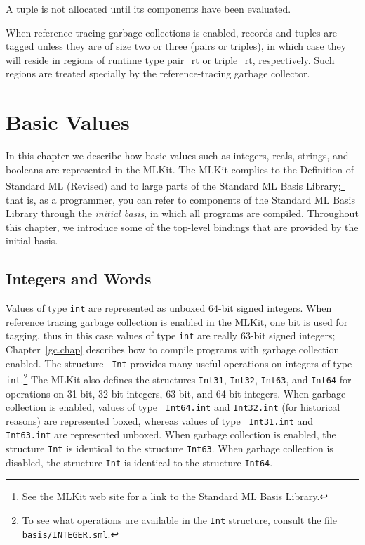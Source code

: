 \documentclass[12pt]{book}
\begin{document}
A tuple is not allocated until its components have been evaluated.

When reference-tracing garbage collections is enabled, records and
tuples are tagged unless they are of size two or three (pairs or
triples), in which case they will reside in regions of runtime type
{\sc pair\_rt} or {\sc triple\_rt}, respectively. Such regions are
treated specially by the reference-tracing garbage collector.

\chapter{Basic Values}
In this chapter we describe how basic values such as integers, reals,
strings, and booleans are represented in the MLKit. The MLKit complies to
the Definition of Standard ML (Revised)
%
and to large parts of the Standard ML Basis
Library;\footnote{See the MLKit web site for a link to the Standard ML
  Basis Library.}
%
%
that is, as a programmer, you can refer to components of the Standard
ML Basis Library through the
%
{\em initial basis}, in which all programs are compiled.  Throughout
this chapter, we introduce some of the top-level bindings that are
provided by the initial basis.

\section{Integers and Words}
\label{integers.sec}
Values of type
%
{\tt int} are represented as unboxed 64-bit signed integers. When
reference tracing garbage collection is enabled in the MLKit, one bit is
used for tagging, thus in this case values of type {\tt int} are
really 63-bit signed integers; Chapter~\ref{gc.chap} describes how to
compile programs with garbage collection enabled. The structure {\tt
  Int} provides many useful operations on integers of type {\tt
  int}.\footnote{To see what operations are available in the {\tt Int}
  structure, consult the file {\tt basis/INTEGER.sml}.}  The MLKit
also defines the structures
%
{\tt Int31},
%
{\tt Int32},
%
{\tt Int63}, and
%
{\tt Int64} for operations on 31-bit, 32-bit integers, 63-bit, and 64-bit integers. When garbage collection is enabled, values of type {\tt
  Int64.int} and {\tt Int32.int} (for historical reasons) are represented boxed, whereas values of type {\tt
  Int31.int} and {\tt Int63.int} are represented unboxed. When garbage
collection is enabled, the structure {\tt Int} is identical to the
structure {\tt Int63}. When garbage collection is disabled, the
structure {\tt Int} is identical to the structure {\tt Int64}.
\end{document}
